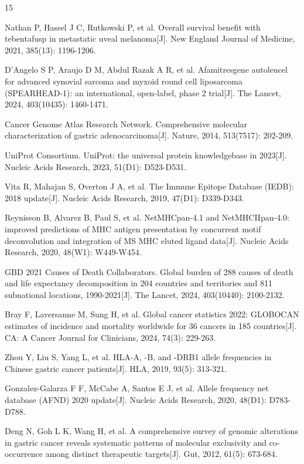 \documentclass[12pt,a4paper]{ctexart}
\begin{document}
\begin{thebibliography}{15}

 Nathan P, Hassel J C, Rutkowski P, et al. Overall survival benefit with tebentafusp in metastatic uveal melanoma[J]. New England Journal of Medicine, 2021, 385(13): 1196-1206.

 D'Angelo S P, Araujo D M, Abdul Razak A R, et al. Afamitresgene autoleucel for advanced synovial sarcoma and myxoid round cell liposarcoma (SPEARHEAD-1): an international, open-label, phase 2 trial[J]. The Lancet, 2024, 403(10435): 1460-1471.

 Cancer Genome Atlas Research Network. Comprehensive molecular characterization of gastric adenocarcinoma[J]. Nature, 2014, 513(7517): 202-209.

 UniProt Consortium. UniProt: the universal protein knowledgebase in 2023[J]. Nucleic Acids Research, 2023, 51(D1): D523-D531.

 Vita R, Mahajan S, Overton J A, et al. The Immune Epitope Database (IEDB): 2018 update[J]. Nucleic Acids Research, 2019, 47(D1): D339-D343.

 Reynisson B, Alvarez B, Paul S, et al. NetMHCpan-4.1 and NetMHCIIpan-4.0: improved predictions of MHC antigen presentation by concurrent motif deconvolution and integration of MS MHC eluted ligand data[J]. Nucleic Acids Research, 2020, 48(W1): W449-W454.

 GBD 2021 Causes of Death Collaborators. Global burden of 288 causes of death and life expectancy decomposition in 204 countries and territories and 811 subnational locations, 1990-2021[J]. The Lancet, 2024, 403(10440): 2100-2132.

 Bray F, Laversanne M, Sung H, et al. Global cancer statistics 2022: GLOBOCAN estimates of incidence and mortality worldwide for 36 cancers in 185 countries[J]. CA: A Cancer Journal for Clinicians, 2024, 74(3): 229-263.

 Zhou Y, Liu S, Yang L, et al. HLA-A, -B, and -DRB1 allele frequencies in Chinese gastric cancer patients[J]. HLA, 2019, 93(5): 313-321.

 Gonzalez-Galarza F F, McCabe A, Santos E J, et al. Allele frequency net database (AFND) 2020 update[J]. Nucleic Acids Research, 2020, 48(D1): D783-D788.

 Deng N, Goh L K, Wang H, et al. A comprehensive survey of genomic alterations in gastric cancer reveals systematic patterns of molecular exclusivity and co-occurrence among distinct therapeutic targets[J]. Gut, 2012, 61(5): 673-684.


\end{thebibliography}
\end{document}
